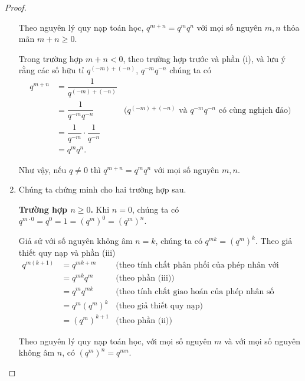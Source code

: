 \begin{proof}
\begin{enumerate}[label={(\roman*)}]
              Theo nguyên lý quy nạp toán học, $q^{m + n} = q^{m}q^{n}$ với mọi số nguyên $m, n$ thỏa mãn $m+n\geq 0$.

              Trong trường hợp $m + n < 0$, theo trường hợp trước và phần (i), và lưu ý rằng các số hữu tỉ $q^{(-m) + (-n)}$, $q^{-m}q^{-n}$ chúng ta có
              \begin{align*}
                  q^{m+n} & = \dfrac{1}{q^{(-m) + (-n)}}                                                                                 \\
                          & = \dfrac{1}{q^{-m}q^{-n}}                  & \text{($q^{(-m) + (-n)}$ và $q^{-m}q^{-n}$ có cùng nghịch đảo)} \\
                          & = \dfrac{1}{q^{-m}}\cdot \dfrac{1}{q^{-n}}                                                                   \\
                          & = q^{m}q^{n}.
              \end{align*}

              Như vậy, nếu $q\ne 0$ thì $q^{m + n} = q^{m}q^{n}$ với mọi số nguyên $m, n$.
        \item Chúng ta chứng minh cho hai trường hợp sau.

              \textbf{Trường hợp $n\geq 0$.} Khi $n = 0$, chúng ta có $q^{m\cdot 0} = q^{0} = 1 = {(q^{m})}^{0} = {(q^{m})}^{n}$.

              Giả sử với số nguyên không âm $n = k$, chúng ta có $q^{mk} = {(q^{m})}^{k}$. Theo giả thiết quy nạp và phần (iii)
              \begin{align*}
                  q^{m(k+1)} & = q^{mk + m}         & \text{(theo tính chất phân phối của phép nhân với phép cộng số nguyên)} \\
                             & = q^{mk}q^{m}        & \text{(theo phần (iii))}                                                \\
                             & = q^{m}q^{mk}        & \text{(theo tính chất giao hoán của phép nhân số nguyên)}               \\
                             & = q^{m}{(q^{m})}^{k} & \text{(theo giả thiết quy nạp)}                                         \\
                             & = {(q^{m})}^{k+1}    & \text{(theo phần (ii))}
              \end{align*}

              Theo nguyên lý quy nạp toán học, với mọi số nguyên $m$ và với mọi số nguyên không âm $n$, có ${(q^{m})}^{n} = q^{mn}$.


\end{enumerate}
\end{proof}
